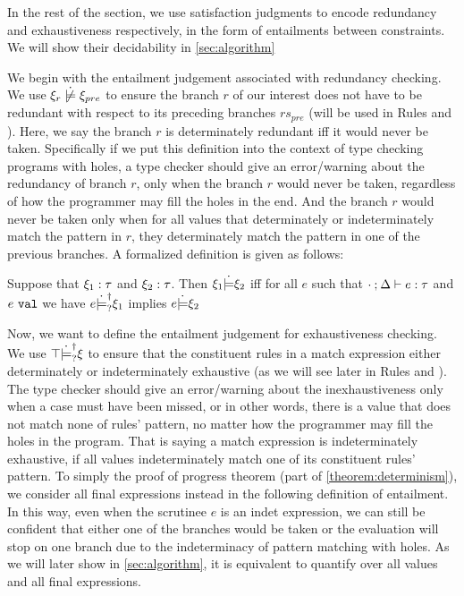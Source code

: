 In the rest of the section, we use satisfaction judgments to encode redundancy and exhaustiveness respectively, in the form of entailments between constraints. We will show their decidability in \autoref{sec:algorithm}

We begin with the entailment judgement associated with redundancy checking. We use $\cnotsatisfy{\xi_r}{\xi_{pre}}$ to ensure the branch $r$ of our interest does not have to be redundant with respect to its preceding branches $rs_{pre}$ (will be used in Rules \TOneRules and \TRules).
Here, we say the branch $r$ is determinately redundant iff it would never be taken. 
Specifically if we put this definition into the context of type checking programs with holes,
a type checker should give an error/warning about the redundancy of branch $r$,
only when the branch $r$ would never be taken, regardless of how the programmer may fill the holes in the end.
And the branch $r$ would never be taken only when for all values that determinately or indeterminately match the pattern in $r$, they determinately match the pattern in one of the previous branches.
A formalized definition is given as follows:

\begin{definition}
  \label{definition:const-entailment}
  Suppose that $\xi_1 : \tau$ and $\xi_2 : \tau$.
  Then $\xi_1 \dot{\models} \xi_2$ iff for all $e$ such that $\cdot \mathbin{;} \Delta \vdash e : \tau$ and $e ~\mathtt{val}$ we have $e \dot{\models}_{?}^{\dag} \xi_1$ implies $e \dot{\models} \xi_2$
\end{definition}

Now, we want to define the entailment judgement for exhaustiveness checking. 
We use $\top \dot{\models}_{?}^{\dag} \xi$ to ensure that the constituent rules in a match expression either determinately or indeterminately exhaustive (as we will see later in Rules \TMatchZPre and \TMatchNZPre). 
The type checker should give an error/warning about the inexhaustiveness only when a case must have been missed, or in other words, there is a value that does not match none of rules' pattern, no matter how the programmer may fill the holes in the program. That is saying a match expression is indeterminately exhaustive, if all values indeterminately match one of its constituent rules' pattern.
To simply the proof of progress theorem (part of \autoref{theorem:determinism}), we consider all final expressions instead in the following definition of entailment. 
In this way, even when the scrutinee $e$ is an indet expression, we can still be confident that either one of the branches would be taken or the evaluation will stop on one branch due to the indeterminacy of pattern matching with holes. As we will later show in \autoref{sec:algorithm}, it is equivalent to quantify over all values and all final expressions.

